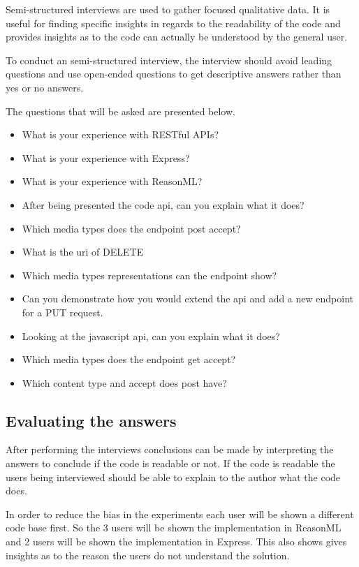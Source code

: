 Semi-structured interviews are used to gather focused qualitative data. It is
useful for finding specific insights in regards to the readability of the code
and provides insights as to the code can actually be understood by the general
user.

To conduct an semi-structured interview, the interview should avoid leading
questions and use open-ended questions to get descriptive answers rather than
yes or no answers. 

The questions that will be asked are presented below.

\begin{itemize}
    \item What is your experience with RESTful APIs?
    \item What is your experience with Express?
    \item What is your experience with ReasonML?
    \item After being presented the code api, can you explain what it does?
    \item Which media types does the endpoint post accept?
    \item What is the uri of DELETE
    \item Which media types representations can the endpoint show?
    \item Can you demonstrate how you would extend the api and add a new endpoint
    for a PUT request.
    \item Looking at the javascript api, can you explain what it does?
    \item Which media types does the endpoint get accept?
    \item Which content type and accept does post have?
\end{itemize}

\subsection{Evaluating the answers}

After performing the interviews conclusions can be made by interpreting the
answers to conclude if the code is readable or not. If the code is readable the
users being interviewed should be able to explain to the author what the code
does.

In order to reduce the bias in the experiments each user will be shown a
different code base first. So the 3 users will be shown the implementation in
ReasonML and 2 users will be shown the implementation in Express. This also
shows gives insights as to the reason the users do not understand the solution.

